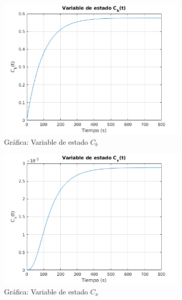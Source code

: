 \documentclass[12pt,letterpaper]{article}
\begin{document}
\begin{figure}
  \begin{subfigure}[b]{0.45\textwidth}
    	\includegraphics[width=\textwidth]{pictures/Ejercicio4/var_estado_Cb}
	\caption{Gráfica: Variable de estado $C_b$}
	\label{fig:var_estado_Cb}
  \end{subfigure}
  \begin{subfigure}[b]{0.45\textwidth}
	\includegraphics[width=\textwidth]{pictures/Ejercicio4/var_estado_Cx}
	\caption{Gráfica: Variable de estado $C_x$}
	\label{fig:var_estado_Cx}
  \end{subfigure}
  \vfill
  \begin{subfigure}[b]{0.45\textwidth}

\end{subfigure}
\end{figure}
\end{document}
